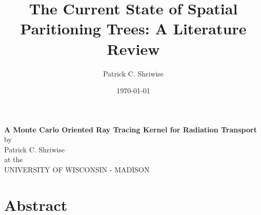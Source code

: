 \documentclass[12pt, a4paper]{article}
\title{\textbf{The Current State of Spatial Paritioning Trees: A Literature Review}}
\author{Patrick C. Shriwise}
\date{\today}
\begin{document}
\begin{center}
  \textbf{A Monte Carlo Oriented Ray Tracing Kernel for Radiation Transport} \\
  \bigskip
  by \\
  \bigskip
  Patrick C. Shriwise \\
  \bigskip 
  at the \\
  \bigskip
  UNIVERSITY OF WISCONSIN - MADISON \\
\end{center}

\newpage
\tableofcontents 

\section{Abstract}%
\end{document}
